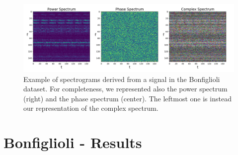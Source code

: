 \documentclass[../main.tex]{subfiles}
\begin{document}
\begin{figure}[ht]
	\centering
	\includegraphics[width=\textwidth]{pictures/example_bonfiglioli_spectrum}
	\caption{Example of spectrograms derived from a signal in the Bonfiglioli dataset. For completeness, we represented also the power spectrum (right) and the phase spectrum (center). The leftmost one is instead our representation of the complex spectrum.}
	\label{fig:example_bonfiglioli_spectrum}
\end{figure}


\section{Bonfiglioli - Results}
\end{document}
